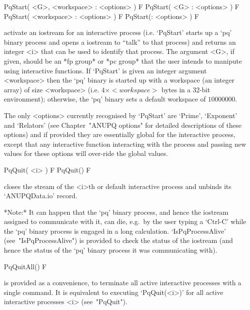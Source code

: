 
\>PqStart( <G>, <workspace> : <options> ) F
\>PqStart( <G> : <options> ) F
\>PqStart( <workspace> : <options> ) F
\>PqStart(: <options> ) F

activate an iostream for an interactive {\ANUPQ} process (i.e.  `PqStart'
starts up a `pq' binary process and opens a {\GAP} iostream  to  ``talk''
to that process) and returns an integer <i> that can be used to  identify
that process. The argument <G>, if given, should be an *fp group* or  *pc
group* that the user  intends  to  manipute  using  interactive  {\ANUPQ}
functions. If `PqStart' is given an integer argument <workspace> then the
`pq' binary is started up with a workspace (an  integer  array)  of  size
<workspace> (i.e. $4 \times <workspace>$ bytes in a 32-bit  environment);
otherwise, the `pq' binary sets a default workspace of $10000000$.

The  only  <options>  currently  recognised  by  `PqStart'  are  `Prime',
`Exponent' and  `Relators'  (see  Chapter~"ANUPQ  options"  for  detailed
descriptions of these options)  and  if  provided  they  are  essentially
global for the interactive {\ANUPQ} process, except that any  interactive
function interacting with the process and passing new  values  for  these
options will over-ride the global values.

\>PqQuit( <i> ) F
\>PqQuit() F

closes the stream of the <i>th or default  interactive  {\ANUPQ}  process
and unbinds its `ANUPQData.io' record.

*Note:*
It can happen that the `pq' binary process, and hence the {\GAP} iostream
assigned to communicate with it, can  die,  e.g.~by  the  user  typing  a
`Ctrl-C' while the `pq' binary process is engaged in a long  calculation.
`IsPqProcessAlive' (see~"IsPqProcessAlive")  is  provided  to  check  the
status of the {\GAP} iostream (and hence the status of  the  `pq'  binary
process it was communicating with).

\>PqQuitAll() F

is provided  as  a  convenience,  to  terminate  all  active  interactive
{\ANUPQ} processes with a single command. It is equivalent  to  executing
`PqQuit(<i>)'  for  all  active  interactive   {\ANUPQ}   processes   <i>
(see~"PqQuit").


